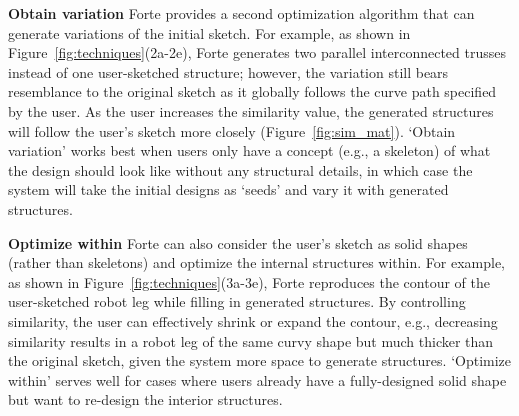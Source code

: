 \textbf{Obtain variation} \hspace{0.1cm} Forte provides a second optimization algorithm that can generate variations of the initial sketch. For example, as shown in Figure~\ref{fig:techniques}(2a-2e), Forte generates two parallel interconnected trusses instead of one user-sketched structure; however, the variation still bears resemblance to the original sketch as it globally follows the curve path specified by the user. As the user increases the similarity value, the generated structures will follow the user's sketch more closely (Figure~\ref{fig:sim_mat}). `Obtain variation' works best when users only have a concept (e.g., a skeleton) of what the design should look like without any structural details, in which case the system will take the initial designs as `seeds' and vary it with generated structures.


\textbf{Optimize within} \hspace{0.1cm} Forte can also consider the user's sketch as solid shapes (rather than skeletons) and optimize the internal structures within. For example, as shown in Figure~\ref{fig:techniques}(3a-3e), Forte reproduces the contour of the user-sketched robot leg while filling in generated structures. By controlling similarity, the user can effectively shrink or expand the contour, e.g., decreasing similarity results in a robot leg of the same curvy shape but much thicker than the original sketch, given the system more space to generate structures. `Optimize within' serves well for cases where users already have a fully-designed solid shape but want to re-design the interior structures.

%

